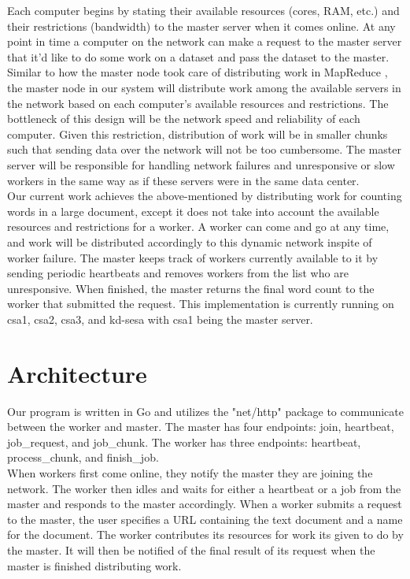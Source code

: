 \documentclass[twoside]{article}
\begin{document}
Each computer begins by stating their available resources (cores, RAM, etc.) and their restrictions (bandwidth) to the master server when it comes online. At any point in time a computer on the network can make a request to the master server that it'd like to do some work on a dataset and pass the dataset to the master. Similar to how the master node took care of distributing work in MapReduce \cite{mapreduce}, the master node in our system will distribute work
among the available servers in the network based
on each computer's available resources and restrictions. The bottleneck of this design will be the network speed and reliability of each computer. Given this restriction, distribution of work will be in smaller chunks such that sending data over the network will not be too cumbersome. The master server will be responsible for handling network failures and unresponsive or slow workers in the same way as if these servers were in the same data center. \\

Our current work achieves the above-mentioned by distributing work for counting words in a large document, except it does not take into account the available resources and restrictions for a worker. A worker can come and go at any time, and work will be distributed accordingly to this dynamic network inspite of worker failure. The master keeps track of workers currently available to it by sending periodic heartbeats and removes workers from the list who are unresponsive. When
finished, the master returns the final word count to the worker that submitted the request. This implementation is currently running on csa1, csa2, csa3, and kd-sesa with csa1 being the master server. 
\section{Architecture}
Our program is written in Go and utilizes the "net/http" package to communicate between the worker and master. The master has four endpoints: join, heartbeat, job\_request, and job\_chunk. The worker has three endpoints: heartbeat, process\_chunk, and finish\_job. \\

When workers first come online, they notify the master they are joining the network. The worker then idles and waits for either a heartbeat or a job from the master and responds to the master accordingly. When a worker submits a request to the master, the user specifies a URL containing the text document and a name for the document. The worker contributes its resources for work its given to do by the master. It will then be notified of the final result of its request when the master is finished
distributing work. \\
\end{document}
